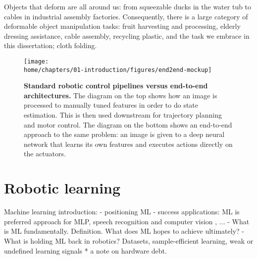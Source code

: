 \documentclass[\home/main.tex]{subfiles}
\begin{document}
Objects that deform are all around us: from squeezable ducks in the water tub to cables in industrial assembly factories. Consequently, there is a large category of deformable object manipulation tasks: fruit harvesting and processing, elderly dressing assistance, cable assembly, recycling plastic, and the task we embrace in this dissertation; cloth folding.

\begin{figure}
    \texttt{[image: \\home/chapters/01-introduction/figures/end2end-mockup]}
    \caption{\textbf{Standard robotic control pipelines versus end-to-end architectures.} The diagram on the top shows how an image is processed to manually tuned features in order to do state estimation. This is then used downstream for trajectory planning and motor control. The diagram on the bottom shows an end-to-end approach to the same problem: an image is given to a deep neural network that learns its own features and executes actions directly on the actuators.}
    \label{fig:intro_end2end}
\end{figure}

\section{Robotic learning}
Machine learning introduction:
    - positioning ML %
    - success applications: ML is preferred approach for MLP, speech recognition and computer vision , ... 
    - What is ML fundamentally. Definition. What does ML hopes to achieve ultimately? 
    - What is holding ML back in robotics? 
        Datasets, sample-efficient learning, weak or undefined learning signals 
        * a note on hardware debt.


% 	
\end{document}
